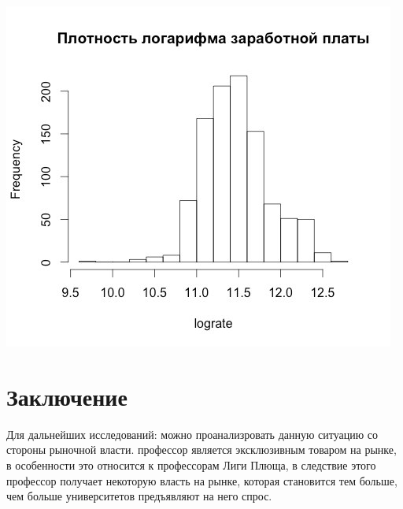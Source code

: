 \documentclass[a4paper, 12pt]{article}
\theoremstyle{definition}
\theoremstyle{plain}
\begin{document}
\begin{center}
\includegraphics[scale=0.5]{image1}
\end{center}

\section{Заключение}

Для дальнейших исследований: можно проанализровать данную ситуацию со стороны рыночной власти. профессор является эксклюзивным товаром на рынке, в особенности это относится к профессорам Лиги Плюща, в следствие этого профессор получает некоторую власть на рынке, которая становится тем больше, чем больше университетов предъявляют на него спрос. 

\renewcommand{\refname}{Список литературы}

 
\end{document}
